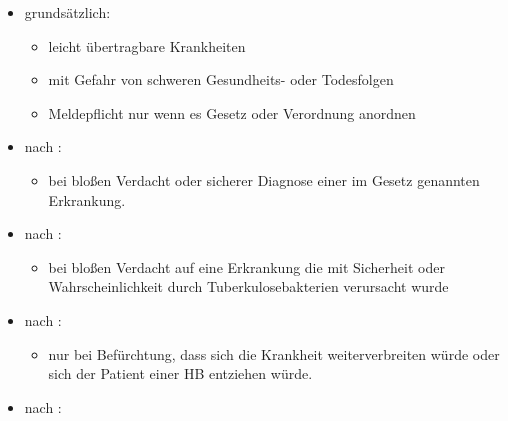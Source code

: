 \begin{itemize}
    \item {\mdseries
    grundsätzlich:}
    
    \begin{itemize}
        \item {\mdseries
        leicht \"ubertragbare Krankheiten}
        
        \item {\mdseries
        mit Gefahr von schweren Gesundheits- oder Todesfolgen}
        
        \item {\mdseries
        Meldepflicht nur wenn es Gesetz oder Verordnung anordnen}
        
    \end{itemize}
    
    \item {\mdseries
    nach : }
    
    \begin{itemize}
        \item {\mdseries
        bei blo{\ss}en Verdacht oder sicherer Diagnose einer im Gesetz genannten
        Erkrankung.}
        
    \end{itemize}
    
    \item {\mdseries
    nach :}
    
    \begin{itemize}
        \item {\mdseries
        bei blo{\ss}en Verdacht auf eine Erkrankung die mit Sicherheit oder
        Wahrscheinlichkeit durch Tuberkulosebakterien verursacht wurde}
        
    \end{itemize}
    
    \item {\mdseries
    nach :}
    
    \begin{itemize}
        \item {\mdseries
        nur bei Bef\"urchtung, dass sich die Krankheit	weiterverbreiten w\"urde oder sich der Patient einer
           HB entziehen w\"urde.}
           
    \end{itemize}
    
    \item {\mdseries
    nach :}
    

\end{itemize}
